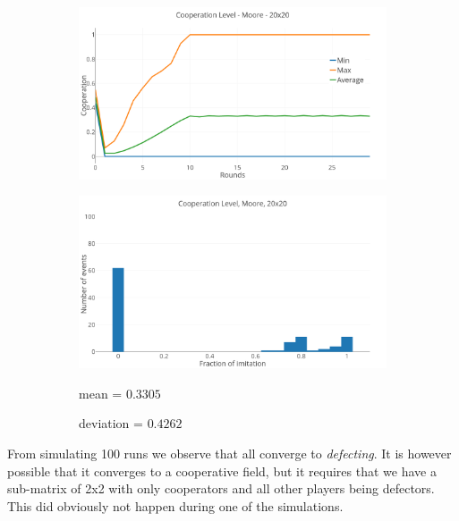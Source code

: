 \documentclass[a4paper, 11pt]{article}
\begin{document}
\begin{figure}[H]
\begin{subfigure}{.75\textwidth}
	\includegraphics[width=1\linewidth]{PDMoore20x20}
\end{subfigure}

\begin{subfigure}{.75\textwidth}
	\includegraphics[width=1\linewidth]{PDMoore20x20HG}
\end{subfigure}%
\begin{subfigure}{.25\textwidth}
	mean = $0.3305$
	
	deviation = $0.4262$
\end{subfigure}

\end{figure}

	From simulating 100 runs we observe that all converge to \textit{defecting}. It is however possible that it converges to a cooperative field, but it requires that we have a sub-matrix of 2x2 with only cooperators and all other players being defectors. This did obviously not happen during one of the simulations.


\newpage
\end{document}
